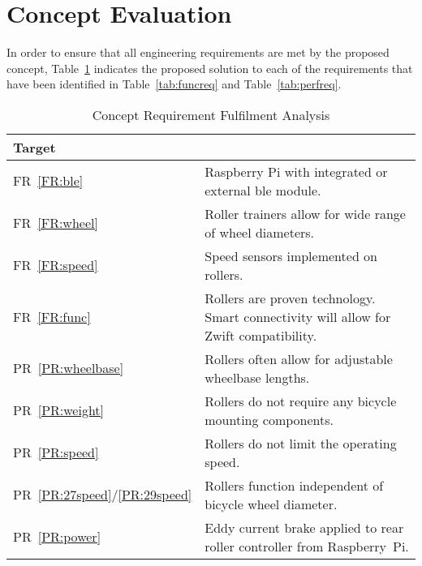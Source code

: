 \section{Concept Evaluation}
\label{sec:eval}

In order to ensure that all engineering requirements are met by the proposed concept, Table~\ref{tab:eval} indicates the proposed solution to each of the requirements that have been identified in Table~\ref{tab:funcreq} and Table~\ref{tab:perfreq}.

\begin{table}[H]
	\renewcommand{\arraystretch}{\tablestretch}
	\centering
	\caption{Concept Requirement Fulfilment Analysis}
	\begin{tabularx}{\textwidth}{p{2cm} >{\raggedright\arraybackslash}X}
		\toprule
		Target                & \multicolumn{1}{c}{Proposed Solution}                                                   \\
		\midrule
		FR~\ref{FR:ble}       & {Raspberry Pi with integrated or external \ac{ble} module.}                             \\
		FR~\ref{FR:wheel}     & {Roller trainers allow for wide range of wheel diameters.}                              \\
		FR~\ref{FR:speed}     & {Speed sensors implemented on rollers.}                                                 \\
		FR~\ref{FR:func}      & {Rollers are proven technology. Smart connectivity will allow for Zwift compatibility.} \\
		PR~\ref{PR:wheelbase} & {Rollers often allow for adjustable wheelbase lengths.}                                 \\
		PR~\ref{PR:weight}    & {Rollers do not require any bicycle mounting components.}                               \\
		PR~\ref{PR:speed}     & {Rollers do not limit the operating speed.}                                             \\
		PR~\ref{PR:27speed}/\ref{PR:29speed}   & {Rollers function independent of bicycle wheel diameter.}                               \\
		PR~\ref{PR:power}     & {Eddy current brake applied to rear roller controller from Raspberry~Pi.}               \\
		\bottomrule
	\end{tabularx}
	\label{tab:eval}
\end{table}